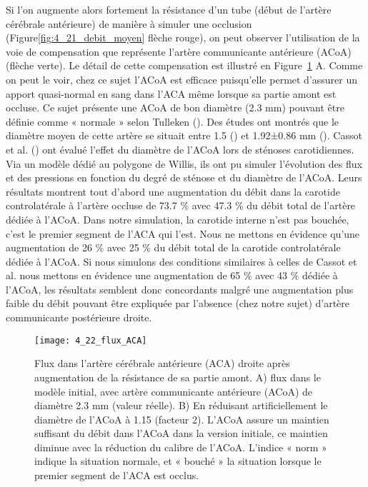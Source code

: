 Si l’on augmente alors fortement la résistance d’un tube (début de l’artère cérébrale
antérieure) de manière à simuler une occlusion (Figure\ref{fig:4_21_debit_moyen} flèche rouge), on peut observer l’utilisation
de la voie de compensation que représente l’artère communicante antérieure (ACoA) (flèche verte).
Le détail de cette compensation est illustré en Figure~\ref{fig:4_22_flux_ACA} A. Comme on peut le voir, chez ce sujet l’ACoA
est efficace puisqu’elle permet d’assurer un apport quasi-normal en sang dans l’ACA même lorsque sa
partie amont est occluse. Ce sujet présente une ACoA de bon diamètre (2.3 mm) pouvant être définie
comme « normale » selon Tulleken (\cite{Tulleken1978}). Des études ont montrés que le diamètre moyen de cette
artère se situait entre 1.5 (\cite{Perlmutter1976}) et 1.92±0.86 mm (\cite{Hillen1986}). Cassot et al. (\cite{Cassot1995}) ont évalué l’effet du diamètre
de l’ACoA lors de sténoses carotidiennes. Via un modèle dédié au polygone de Willis, ils ont pu simuler
l’évolution des flux et des pressions en fonction du degré de sténose et du diamètre de l’ACoA. Leurs
résultats montrent tout d’abord une augmentation du débit dans la carotide controlatérale à l’artère
occluse de 73.7 \% avec 47.3 \% du débit total de l’artère dédiée à l’ACoA. Dans notre simulation, la
carotide interne n’est pas bouchée, c’est le premier segment de l’ACA qui l’est. Nous ne mettons en
évidence qu’une augmentation de 26 \% avec 25 \% du débit total de la carotide controlatérale dédiée
à l’ACoA. Si nous simulons des conditions similaires à celles de Cassot et al. nous mettons en évidence
une augmentation de 65 \% avec 43 \% dédiée à l’ACoA, les résultats semblent donc concordants malgré
une augmentation plus faible du débit pouvant être expliquée par l’absence (chez notre sujet) d’artère
communicante postérieure droite.\\
\begin{figure}[!t]
\centering
\texttt{[image: 4\_22\_flux\_ACA]}
\caption{ Flux dans l'artère cérébrale antérieure (ACA) droite après augmentation de la résistance de sa partie amont. A)
flux dans le modèle initial, avec artère communicante antérieure (ACoA) de diamètre 2.3 mm (valeur réelle). B) En réduisant
artificiellement le diamètre de l’ACoA à 1.15 (facteur 2). L’ACoA assure un maintien suffisant du débit dans l’ACoA dans la
version initiale, ce maintien diminue avec la réduction du calibre de l’ACoA. L’indice « norm » indique la situation normale, et
« bouché » la situation lorsque le premier segment de l’ACA est occlus.}
\label{fig:4_22_flux_ACA}	
\end{figure}
